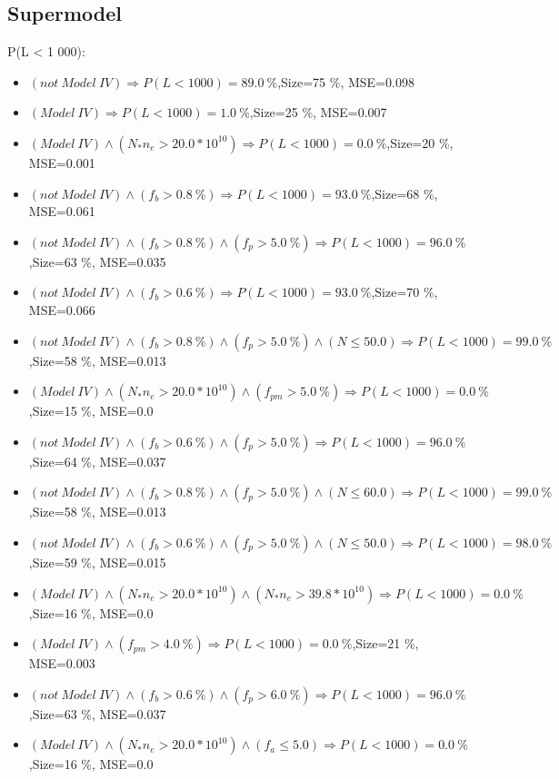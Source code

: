 \documentclass[numbered]{CSL}
\begin{document}
\subsection{Supermodel}
P(L < 1 000):
\begin{itemize}
\item $(not~Model~IV) \Rightarrow P(L < 1 000) = 89.0~\%$,\hfill Size=75 \%, MSE=0.098
\item $(Model~IV) \Rightarrow P(L < 1 000) = 1.0~\%$,\hfill Size=25 \%, MSE=0.007
\item $(Model~IV) \land (N_* n_e > 20.0 * 10^{10}) \Rightarrow P(L < 1 000) = 0.0~\%$,\hfill Size=20 \%, MSE=0.001
\item $(not~Model~IV) \land (f_b > 0.8~\%) \Rightarrow P(L < 1 000) = 93.0~\%$,\hfill Size=68 \%, MSE=0.061
\item $(not~Model~IV) \land (f_b > 0.8~\%) \land (f_p > 5.0~\%) \Rightarrow P(L < 1 000) = 96.0~\%$,\hfill Size=63 \%, MSE=0.035
\item $(not~Model~IV) \land (f_b > 0.6~\%) \Rightarrow P(L < 1 000) = 93.0~\%$,\hfill Size=70 \%, MSE=0.066
\item $(not~Model~IV) \land (f_b > 0.8~\%) \land (f_p > 5.0~\%) \land (N \leq 50.0) \Rightarrow P(L < 1 000) = 99.0~\%$,\hfill Size=58 \%, MSE=0.013
\item $(Model~IV) \land (N_* n_e > 20.0 * 10^{10}) \land (f_{pm} > 5.0~\%) \Rightarrow P(L < 1 000) = 0.0~\%$,\hfill Size=15 \%, MSE=0.0
\item $(not~Model~IV) \land (f_b > 0.6~\%) \land (f_p > 5.0~\%) \Rightarrow P(L < 1 000) = 96.0~\%$,\hfill Size=64 \%, MSE=0.037
\item $(not~Model~IV) \land (f_b > 0.8~\%) \land (f_p > 5.0~\%) \land (N \leq 60.0) \Rightarrow P(L < 1 000) = 99.0~\%$,\hfill Size=58 \%, MSE=0.013
\item $(not~Model~IV) \land (f_b > 0.6~\%) \land (f_p > 5.0~\%) \land (N \leq 50.0) \Rightarrow P(L < 1 000) = 98.0~\%$,\hfill Size=59 \%, MSE=0.015
\item $(Model~IV) \land (N_* n_e > 20.0 * 10^{10}) \land (N_* n_e > 39.8 * 10^{10}) \Rightarrow P(L < 1 000) = 0.0~\%$,\hfill Size=16 \%, MSE=0.0
\item $(Model~IV) \land (f_{pm} > 4.0~\%) \Rightarrow P(L < 1 000) = 0.0~\%$,\hfill Size=21 \%, MSE=0.003
\item $(not~Model~IV) \land (f_b > 0.6~\%) \land (f_p > 6.0~\%) \Rightarrow P(L < 1 000) = 96.0~\%$,\hfill Size=63 \%, MSE=0.037
\item $(Model~IV) \land (N_* n_e > 20.0 * 10^{10}) \land (f_a \leq 5.0) \Rightarrow P(L < 1 000) = 0.0~\%$,\hfill Size=16 \%, MSE=0.0

\end{itemize}
\end{document}
